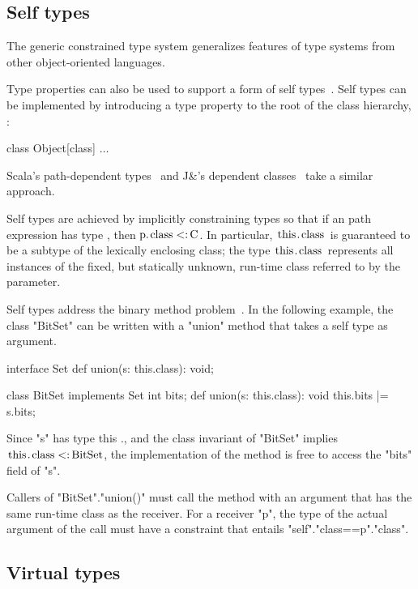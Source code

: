 \documentclass[preprint,nocopyrightspace,9pt]{sigplanconf}
\begin{document}
\subsection{Self types}

The generic constrained type system generalizes
features of type systems from other object-oriented languages.

Type properties can also be used to support a form of self
types~\cite{bruce-binary,bsg95}. 
%
Self types can be implemented by introducing a
type property  to the root of the class hierarchy, :
\begin{xtenmath}
class Object[class] { $\dots$ }
\end{xtenmath}
Scala's path-dependent types~\cite{scala} and J\&'s
dependent classes~\cite{nqm06}
take a similar approach.

Self types are achieved by
implicitly constraining types so that if an path expression 
has type , then
$\Xcd{p}.\Xcd{class} \subtype \Xcd{C}$.  In particular,
$\Xcd{this}.\Xcd{class}$ is guaranteed to be a subtype
of the lexically enclosing class; the type
$\Xcd{this}.\Xcd{class}$ represents all instances of the fixed,
but statically unknown, run-time class referred to by the 
parameter.

Self types address the binary method problem~\cite{bruce-binary}.
In the following
example, the class \xcd"BitSet" can be written with a
\xcd"union" method that takes a self type as argument.

\begin{xtenmath}
interface Set {
  def union(s: this.class): void;
}

class BitSet implements Set {
  int bits;
  def union(s: this.class): void {
    this.bits |= s.bits;
  }
}
\end{xtenmath}

\noindent
Since \xcd"s" has type this ., and the class
invariant of \xcd"BitSet" implies
$\Xcd{this}.\Xcd{class} \subtype \Xcd{BitSet}$,
the implementation of the method is free to access the
\xcd"bits" field of \xcd"s".

Callers of \xcd"BitSet".\xcd"union()" must call the method with
an argument that has the same run-time class as the
receiver.  For a receiver \xcd"p", the
type of the actual argument of the call must have a constraint
that entails \xcd"self".\xcd"class==p".\xcd"class".

\subsection{Virtual types}
\end{document}
